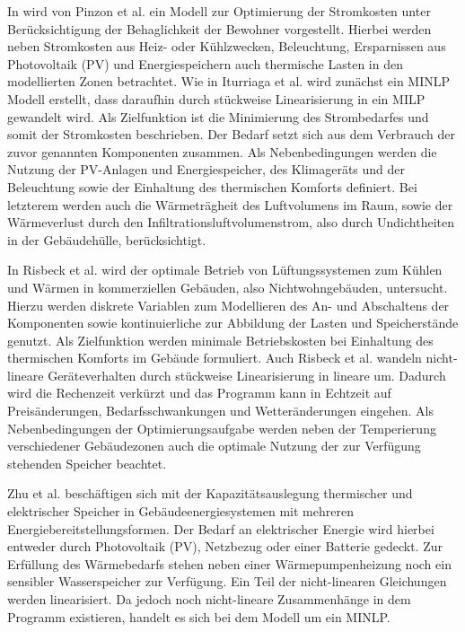 In \cite{Pinzon.23.04.201726.04.2017} wird von Pinzon et al. ein Modell zur Optimierung der Stromkosten unter Berücksichtigung der Behaglichkeit der Bewohner vorgestellt.
Hierbei werden neben Stromkosten aus Heiz- oder Kühlzwecken, Beleuchtung, Ersparnissen aus Photovoltaik (PV) und Energiespeichern auch thermische Lasten in den modellierten Zonen betrachtet.
Wie in Iturriaga et al. \cite{Iturriaga.2017} wird zunächst ein MINLP Modell erstellt, dass daraufhin durch stückweise Linearisierung in ein MILP gewandelt wird.
Als Zielfunktion ist die Minimierung des Strombedarfes und somit der Stromkosten beschrieben.
Der Bedarf setzt sich aus dem Verbrauch der zuvor genannten Komponenten zusammen.
Als Nebenbedingungen werden die Nutzung der PV-Anlagen und Energiespeicher, des Klimageräts und der Beleuchtung sowie der Einhaltung des thermischen Komforts definiert.
Bei letzterem werden auch die Wärmeträgheit des Luftvolumens im Raum, sowie der Wärmeverlust durch den Infiltrationsluftvolumenstrom, also durch Undichtheiten in der Gebäudehülle, berücksichtigt.

In Risbeck et al. \cite{Risbeck.2017} wird der optimale Betrieb von Lüftungssystemen zum Kühlen und Wärmen in kommerziellen Gebäuden, also Nichtwohngebäuden, untersucht.
Hierzu werden diskrete Variablen zum Modellieren des An- und Abschaltens der Komponenten sowie kontinuierliche zur Abbildung der Lasten und Speicherstände genutzt.
Als Zielfunktion werden minimale Betriebskosten bei Einhaltung des thermischen Komforts im Gebäude formuliert.
Auch Risbeck et al. wandeln nicht-lineare Geräteverhalten durch stückweise Linearisierung in lineare um.
Dadurch wird die Rechenzeit verkürzt und das Programm kann in Echtzeit auf Preisänderungen, Bedarfsschwankungen und Wetteränderungen eingehen.
Als Nebenbedingungen der Optimierungsaufgabe werden neben der Temperierung verschiedener Gebäudezonen auch die optimale Nutzung der zur Verfügung stehenden Speicher beachtet.

Zhu et al. \cite{Zhu.2019} beschäftigen sich mit der Kapazitätsauslegung thermischer und elektrischer Speicher in Gebäudeenergiesystemen mit mehreren Energiebereitstellungsformen. 
Der Bedarf an elektrischer Energie wird hierbei entweder durch Photovoltaik (PV), Netzbezug oder einer Batterie gedeckt. 
Zur Erfüllung des Wärmebedarfs stehen neben einer Wärmepumpenheizung noch ein sensibler Wasserspeicher zur Verfügung.
Ein Teil der nicht-linearen Gleichungen werden linearisiert. Da jedoch noch nicht-lineare Zusammenhänge in dem Programm existieren, handelt es sich bei dem Modell um ein MINLP.

